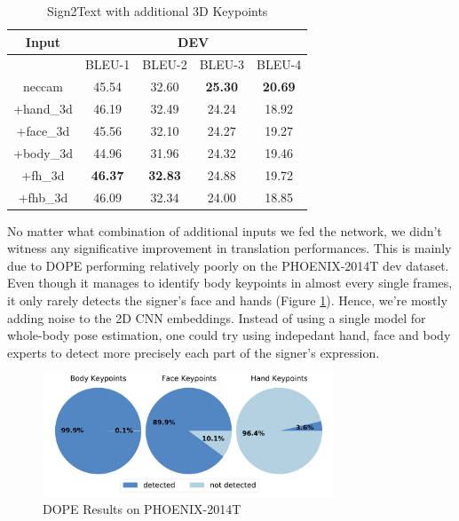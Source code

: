 \documentclass[final]{cvpr}
\begin{document}
\begin{table}[h]
	\centering
	\def\arraystretch{0.9}
	\begin{tabular}{*5c}
		\toprule
		Input &  \multicolumn{4}{c}{DEV}\\
		\midrule
		{}   & BLEU-1   & BLEU-2    & BLEU-3   & BLEU-4\\
		neccam   &  45.54 & 32.60  & \textbf{25.30}  & \textbf{20.69}\\
		+hand\_3d   &  46.19 & 32.49   & 24.24  & 18.92\\
		+face\_3d   &  45.56  &  32.10 & 24.27  & 19.27\\
		+body\_3d   &  44.96 &  31.96   & 24.32  & 19.46\\	
		+fh\_3d\footnotemark[3]  &  \textbf{46.37} &  \textbf{32.83}   & 24.88  & 19.72\\	
		+fhb\_3d\footnotemark[4]  &  46.09 &  32.34   & 24.00  & 18.85\\	
		\bottomrule
	\end{tabular}
	\caption{Sign2Text with additional 3D Keypoints}
	\label{tab:3d_keypoints}
\end{table}

No matter what combination of additional inputs we fed the network, we didn't witness any significative improvement in translation performances. This is mainly due to DOPE performing relatively poorly on the PHOENIX-2014T dev dataset. Even though it manages to identify body keypoints in almost every single frames, it only rarely detects the signer's face and hands (Figure \ref{fig:pie_charts}). Hence, we're mostly adding noise to the 2D CNN embeddings. Instead of using a single model for whole-body pose estimation, one could try using indepedant hand, face and body experts to detect more precisely each part of the signer's expression.

\begin{figure}[h]
	\centering
	\includegraphics[width=8.7cm]{fig/keypoints.pdf}
	\caption{DOPE Results on  PHOENIX-2014T}
	\label{fig:pie_charts}
\end{figure} 
\end{document}
